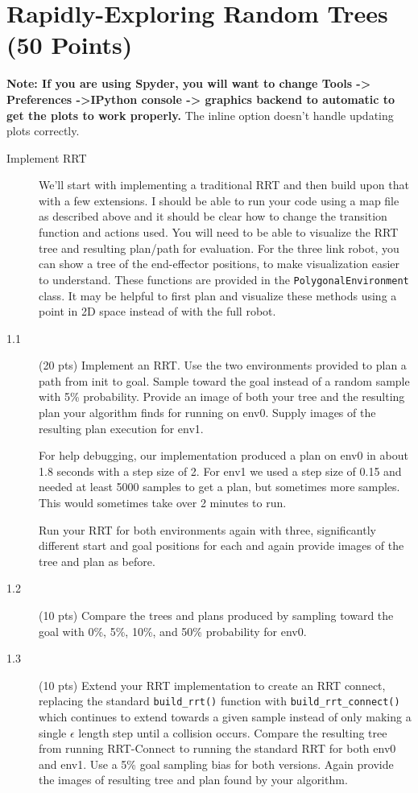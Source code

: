 \documentclass[11pt]{kuntz-hw}
\begin{document}
\section*{Rapidly-Exploring Random Trees (50 Points)}
\textbf{Note: If you are using Spyder, you will want to change Tools -> Preferences ->IPython console -> graphics backend to automatic to get the plots to work properly.} The inline option doesn't handle updating plots correctly.
\begin{description}

\item[Implement RRT] We'll start with implementing a traditional RRT and then build upon that with a few extensions. I should be able to run your code using a map file as described above and it should be clear how to change the transition function and actions used. You will need to be able to visualize the RRT tree and resulting plan/path for evaluation. For the three link robot, you can show a tree of the end-effector positions, to make visualization easier to understand. These functions are provided in the \texttt{PolygonalEnvironment} class.
It may be helpful to first plan and visualize these methods using a point in 2D space instead of with the full robot.

\item[1.1] (20 pts) Implement an RRT. Use the two environments provided to plan a path from init to goal. Sample toward the goal instead of a random sample with 5\% probability. Provide an image of both your tree and the resulting plan your algorithm finds for running on env0. Supply images of the resulting plan execution for env1.

For help debugging, our implementation produced a plan on env0 in about 1.8 seconds with a step size of 2.
For env1 we used a step size of 0.15 and needed at least 5000 samples to get a plan, but sometimes more samples. This would sometimes take over 2 minutes to run.

Run your RRT for both environments again with three, significantly different start and goal positions for each and again provide images of the tree and plan as before.

\item[1.2] (10 pts) Compare the trees and plans produced by sampling toward the goal with 0\%, 5\%, 10\%, and 50\% probability for env0.

\item[1.3] (10 pts) Extend your RRT implementation to create an RRT connect, replacing the standard \texttt{build\_rrt()} function with \texttt{build\_rrt\_connect()} which continues to extend towards a given sample instead of only making a single \(\epsilon\) length step until a collision occurs. Compare the resulting tree from running RRT-Connect to running the standard RRT for both env0 and env1. Use a 5\% goal sampling bias for both versions. Again provide the images of resulting tree and plan found by your algorithm.


\end{description}
\end{document}
